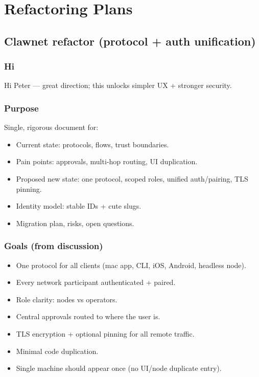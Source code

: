 \chapter{Refactoring Plans}

\section{Clawnet refactor (protocol + auth unification)}


\subsection{Hi}


Hi Peter — great direction; this unlocks simpler UX + stronger security.

\subsection{Purpose}


Single, rigorous document for:

\begin{itemize}
  \item Current state: protocols, flows, trust boundaries.
  \item Pain points: approvals, multi‑hop routing, UI duplication.
  \item Proposed new state: one protocol, scoped roles, unified auth/pairing, TLS pinning.
  \item Identity model: stable IDs + cute slugs.
  \item Migration plan, risks, open questions.
\end{itemize}


\subsection{Goals (from discussion)}


\begin{itemize}
  \item One protocol for all clients (mac app, CLI, iOS, Android, headless node).
  \item Every network participant authenticated + paired.
  \item Role clarity: nodes vs operators.
  \item Central approvals routed to where the user is.
  \item TLS encryption + optional pinning for all remote traffic.
  \item Minimal code duplication.
  \item Single machine should appear once (no UI/node duplicate entry).
\end{itemize}



